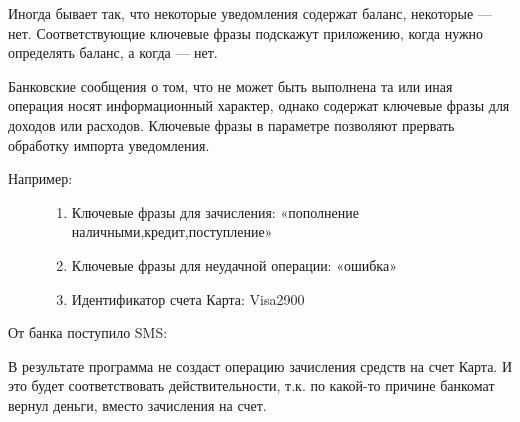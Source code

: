 \documentclass[a4paper,10pt,russian]{sphinxmanual}
\begin{document}
\noindent{}
\noindent{}

Иногда бывает так, что некоторые уведомления содержат баланс, некоторые — нет. Соответствующие ключевые фразы
подскажут приложению, когда нужно определять баланс, а когда — нет.

Банковские сообщения о том, что не может быть выполнена та или иная операция носят информационный характер,
однако содержат ключевые фразы для доходов или расходов. Ключевые фразы в параметре  позволяют
прервать обработку импорта уведомления.
\begin{description}
\item[{Например:}] \leavevmode\begin{enumerate}
\def\theenumi{\arabic{enumi}}
\def\labelenumi{\theenumi .}
\makeatletter\def\p@enumii{\p@enumi \theenumi .}\makeatother
\item {} 
Ключевые фразы для зачисления: «пополнение наличными,кредит,поступление»

\item {} 
Ключевые фразы для неудачной операции: «ошибка»

\item {} 
Идентификатор счета Карта: Visa2900

\end{enumerate}

\end{description}

От банка поступило SMS:

\begin{sphinxVerbatim}[commandchars=\\\{\}]
           
\end{sphinxVerbatim}

В результате программа не создаст операцию зачисления средств на счет Карта. И это будет соответствовать действительности,
т.к. по какой-то причине банкомат вернул деньги, вместо зачисления на счет.
\end{document}
